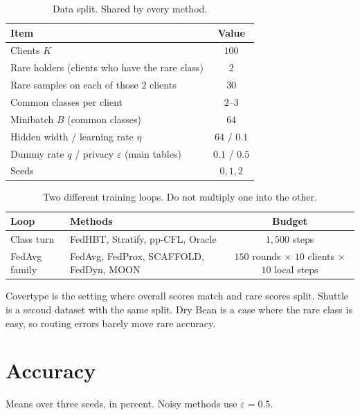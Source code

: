 \documentclass[11pt,a4paper]{article}
\theoremstyle{plain}
\begin{document}
\begin{table}[h]
\centering
\caption{Data split. Shared by every method.}
\begin{tabular}{lc}
\toprule
Item & Value \\
\midrule
Clients $K$ & $100$ \\
Rare holders (clients who have the rare class) & $2$ \\
Rare samples on each of those $2$ clients & $30$ \\
Common classes per client & $2$--$3$ \\
Minibatch $B$ (common classes) & $64$ \\
Hidden width / learning rate $\eta$ & $64$ / $0.1$ \\
Dummy rate $q$ / privacy $\varepsilon$ (main tables) & $0.1$ / $0.5$ \\
Seeds & $0,1,2$ \\
\bottomrule
\end{tabular}
\end{table}

\begin{table}[h]
\centering
\caption{Two different training loops. Do not multiply one into the other.}
\begin{tabular}{llc}
\toprule
Loop & Methods & Budget \\
\midrule
Class turn & FedHBT, Stratify, pp-CFL, Oracle & $1{,}500$ steps \\
FedAvg family & FedAvg, FedProx, SCAFFOLD, FedDyn, MOON & $150$ rounds $\times$ $10$ clients $\times$ $10$ local steps \\
\bottomrule
\end{tabular}
\end{table}

Covertype is the setting where overall scores match and rare scores split. Shuttle is a second dataset with the same split. Dry Bean is a case where the rare class is easy, so routing errors barely move rare accuracy.

\section{Accuracy}

Means over three seeds, in percent. Noisy methods use $\varepsilon=0.5$.
\end{document}
